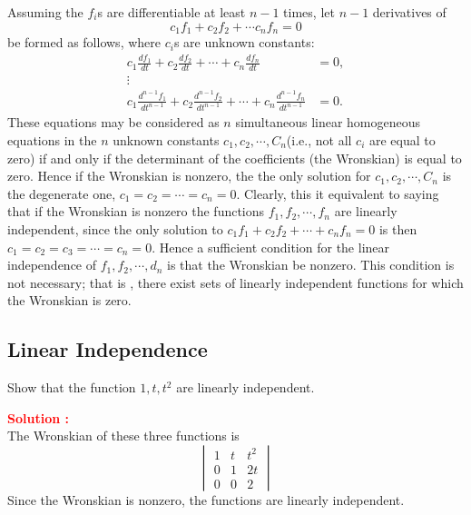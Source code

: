 \documentclass[12pt]{article}
\begin{document}
Assuming the \(f_i\)s are differentiable at least \(n-1\) times, let \(n-1\) derivatives of 
\begin{equation}
    c_1 f_1 + c_2 f_2 + \cdots c_n f_n = 0
\end{equation}
be formed as follows, where \(c_i\)s are unknown constants:
\begin{equation}
\begin{aligned}
c_1 \frac{d f_1}{dt} + c_2 \frac{d f_2}{dt} + \cdots + c_n \frac{d f_n}{dt} &= 0, \\
\vdots& \\
c_1 \frac{d^{n-1} f_1}{dt^{n-1}} + c_2 \frac{d^{n-1} f_2}{dt^{n-1}} + \cdots + c_n \frac{d^{n-1} f_n}{dt^{n-1}} &= 0.
\end{aligned}
\end{equation}
These equations may be considered as \(n\) simultaneous linear homogeneous equations in the \(n\) unknown constants \(c_1,c_2,\cdots,C_n\)(i.e., not all \(c_i\) are equal to zero) if and only if the determinant of the coefficients (the Wronskian) is equal to zero. Hence if the Wronskian is nonzero, the the only solution for \(c_1,c_2,\cdots,C_n\) is the degenerate one, \(c_1=c_2=\cdots=c_n = 0\). Clearly, this it equivalent to saying that if the Wronskian is nonzero the functions \(f_1,f_2,\cdots,f_n\) are linearly independent, since the only solution to \(c_1 f_1 + c_2 f_2 + \cdots + c_n f_n = 0\) is then \(c_1 = c_2 = c_3 = \cdots = c_n = 0\). Hence a sufficient condition for the linear independence of \(f_1,f_2,\cdots,d_n\) is that the Wronskian be nonzero. This condition is not necessary; that is , there exist sets of linearly independent functions for which the Wronskian is zero.

\clearpage
\subsection{Linear Independence}

Show that the function \(1,t,t^2\) are linearly independent.

\textbf{\textcolor{red}{Solution :}} \\

The Wronskian of these three functions is 
\begin{equation}
    \begin{vmatrix}
1 & t  & t^2 \\

0 & 1  & 2t \\
0 & 0 & 2

\end{vmatrix}
\end{equation}
Since the Wronskian is nonzero, the functions are linearly independent.
\end{document}
